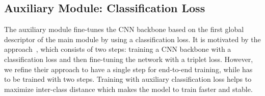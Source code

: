\documentclass[10pt,twocolumn,letterpaper]{article}
\begin{document}
\begin{CJK}{UTF8}{mj}
\begin{comment}
\begin{table*}[h!t!]
\begin{center}
\begin{adjustbox}{width=.95\width,center}
\begin{tabular}{c|cccccccccccc}
\hline
\multirow{2}{*}{Loss} & \multicolumn{12}{c}{Configuration}                                                                                                                                                                                                                                                               \\ \cline{2-13} 
                      & \multicolumn{1}{c|}{S} & \multicolumn{1}{c|}{M} & \multicolumn{1}{c|}{G} & \multicolumn{1}{c|}{SM} & \multicolumn{1}{c|}{MS} & \multicolumn{1}{c|}{SG} & \multicolumn{1}{c|}{GS} & \multicolumn{1}{c|}{MG} & \multicolumn{1}{c|}{GM} & \multicolumn{1}{c|}{SMG} & \multicolumn{1}{c|}{MSG} & GSM \\ \hline\hline
Classification        & \multicolumn{1}{c|}{S} & \multicolumn{1}{c|}{M} & \multicolumn{1}{c|}{G} & \multicolumn{1}{c|}{S}  & \multicolumn{1}{c|}{M}  & \multicolumn{1}{c|}{S}  & \multicolumn{1}{c|}{G}  & \multicolumn{1}{c|}{M}  & \multicolumn{1}{c|}{G}  & \multicolumn{1}{c|}{S}   & \multicolumn{1}{c|}{M}   & G   \\
Ranking               & \multicolumn{1}{c|}{S} & \multicolumn{1}{c|}{M} & \multicolumn{1}{c|}{G} & \multicolumn{1}{c|}{SM} & \multicolumn{1}{c|}{MS} & \multicolumn{1}{c|}{SG} & \multicolumn{1}{c|}{GS} & \multicolumn{1}{c|}{MG} & \multicolumn{1}{c|}{GM} & \multicolumn{1}{c|}{SMG} & \multicolumn{1}{c|}{MSG} & GSM
\end{tabular}
\end{adjustbox}

\end{center}
\caption{Recall@K  std. dev. comparison between using only the ranking loss (Rank) and using both the classification and ranking losses (Both) on CARS196.
We report results over five runs.}
\label{table:temp}
\end{table*}
\end{comment}

\subsection{Auxiliary Module: Classification Loss} \label{sec:auxiliary_module}

The auxiliary module fine-tunes the CNN backbone based on the first global descriptor of the main module by using a classification loss.
It is motivated by the approach~\cite{gordo2017end}, which consists of two steps: training a CNN backbone with a classification loss and then fine-tuning the network with a triplet loss.
However, we refine their approach to have a single step for end-to-end training, while \cite{gordo2017end} has to be trained with two steps.
Training with auxiliary classification loss helps to maximize inter-class distance which makes the model to train faster and stable.



\end{CJK}
\end{document}
